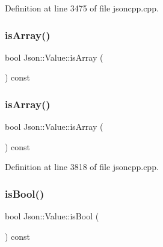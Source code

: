 Definition at line 3475 of file jsoncpp.\+cpp.

\hypertarget{class_json_1_1_value_a1627eb9d6568d6d0252fa8bb711c0a59}{}\label{class_json_1_1_value_a1627eb9d6568d6d0252fa8bb711c0a59} 
\subsubsection{\texorpdfstring{is\+Array()}{isArray()}\hspace{0.1cm}{\footnotesize\ttfamily [1/2]}}
{\footnotesize\ttfamily bool Json\+::\+Value\+::is\+Array (\begin{DoxyParamCaption}{ }\end{DoxyParamCaption}) const}

\hypertarget{class_json_1_1_value_a1627eb9d6568d6d0252fa8bb711c0a59}{}\label{class_json_1_1_value_a1627eb9d6568d6d0252fa8bb711c0a59} 
\subsubsection{\texorpdfstring{is\+Array()}{isArray()}\hspace{0.1cm}{\footnotesize\ttfamily [2/2]}}
{\footnotesize\ttfamily bool Json\+::\+Value\+::is\+Array (\begin{DoxyParamCaption}{ }\end{DoxyParamCaption}) const}



Definition at line 3818 of file jsoncpp.\+cpp.

\hypertarget{class_json_1_1_value_ab1f02651cb89d0f18b63a036959391ba}{}\label{class_json_1_1_value_ab1f02651cb89d0f18b63a036959391ba} 
\subsubsection{\texorpdfstring{is\+Bool()}{isBool()}\hspace{0.1cm}{\footnotesize\ttfamily [1/2]}}
{\footnotesize\ttfamily bool Json\+::\+Value\+::is\+Bool (\begin{DoxyParamCaption}{ }\end{DoxyParamCaption}) const}


